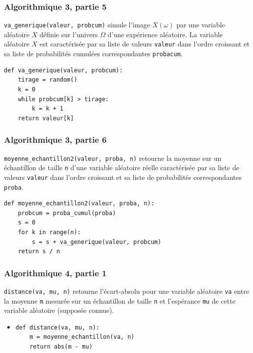 \documentclass[11pt, hyperref={urlcolor=red,%
            linkcolor=blue, %
            colorlinks=true}]{beamer}
\begin{document}
\begin{frame}[fragile]
\frametitle{Algorithmique 3,  partie 5}

\texttt{va\_generique(valeur, probcum)} simule l'image $X(\omega)$ par une  variable aléatoire $X$ définie sur l'univers $\Omega$ d'une expérience aléatoire. La variable aléatoire $X$ est caractérisée par sa liste de valeurs \texttt{valeur} dans l'ordre croissant et sa liste de probabilités cumulées correspondantes \texttt{probacum}.

\begin{lstlisting}[style=rond]
def va_generique(valeur, probcum):
    tirage = random()
    k = 0
    while probcum[k] > tirage:
        k = k + 1
    return valeur[k]
\end{lstlisting}



\end{frame}




\begin{frame}[fragile]
\frametitle{Algorithmique 3,  partie 6}

\texttt{moyenne\_echantillon2(valeur, proba, n)} retourne la moyenne  sur un échantillon de taille \texttt{n} d'une variable aléatoire réelle caractérisée par sa liste de valeurs \texttt{valeur} dans l'ordre croissant et sa liste de probabilités correspondantes \texttt{proba}.

\begin{lstlisting}[style=rond]
def moyenne_echantillon2(valeur, proba, n):
    probcum = proba_cumul(proba)
    s = 0
    for k in range(n):
        s = s + va_generique(valeur, probcum)
    return s / n
\end{lstlisting}



\end{frame}



\begin{frame}[fragile]
\label{algo4}
\frametitle{Algorithmique 4,  partie 1}

\texttt{distance(va, mu, n)} retourne l'écart-absolu pour une variable aléatoire \texttt{va} entre la moyenne \texttt{m} mesurée sur un échantillon de taille \texttt{n} et l'espérance \texttt{mu} de cette variable aléatoire (supposée connue).

\begin{itemize}
\pause \item 
\begin{lstlisting}[style=rond]
def distance(va, mu, n):
    m = moyenne_echantillon(va, n)
    return abs(m - mu)
\end{lstlisting}
\end{itemize}


\end{frame}
\end{document}
